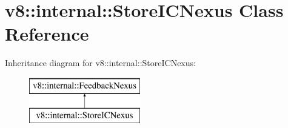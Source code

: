 \hypertarget{classv8_1_1internal_1_1_store_i_c_nexus}{}\section{v8\+:\+:internal\+:\+:Store\+I\+C\+Nexus Class Reference}
\label{classv8_1_1internal_1_1_store_i_c_nexus}
Inheritance diagram for v8\+:\+:internal\+:\+:Store\+I\+C\+Nexus\+:\begin{figure}[H]
\begin{center}
\leavevmode
\includegraphics[height=2.000000cm]{classv8_1_1internal_1_1_store_i_c_nexus}
\end{center}
\end{figure}
